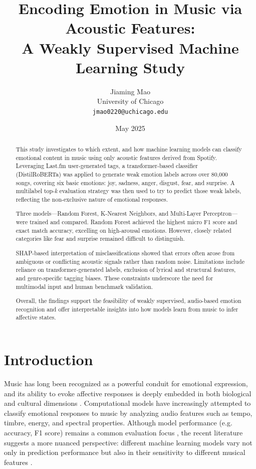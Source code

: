 \documentclass{article}
\title{Encoding Emotion in Music via Acoustic Features:\\
A Weakly Supervised Machine Learning Study}
\author{Jiaming Mao \\ University of Chicago \\ 
\texttt{jmao0220@uchicago.edu}}
\date{May 2025}
\begin{document}
\maketitle

\begin{abstract}
This study investigates to which extent, and how machine learning models can classify emotional content in music using only acoustic features derived from Spotify. Leveraging Last.fm user-generated tags, a transformer-based classifier (DistilRoBERTa) was applied to generate weak emotion labels across over 80,000 songs, covering six basic emotions: joy, sadness, anger, disgust, fear, and surprise. A multilabel top-\textit{k} evaluation strategy was then used to try to predict those weak labels, reflecting the non-exclusive nature of emotional responses.

Three models—Random Forest, K-Nearest Neighbors, and Multi-Layer Perceptron—were trained and compared. Random Forest achieved the highest micro F1 score and exact match accuracy, excelling on high-arousal emotions. However, closely related categories like fear and surprise remained difficult to distinguish. 


SHAP-based interpretation of misclassifications showed that errors often arose from ambiguous or conflicting acoustic signals rather than random noise. Limitations include reliance on transformer-generated labels, exclusion of lyrical and structural features, and genre-specific tagging biases. These constraints underscore the need for multimodal input and human benchmark validation.

Overall, the findings support the feasibility of weakly supervised, audio-based emotion recognition and offer interpretable insights into how models learn from music to infer affective states.
\end{abstract}


\section{Introduction}
    
Music has long been recognized as a powerful conduit for emotional expression, and its ability to evoke affective responses is deeply embedded in both biological and cultural dimensions \parencite{Huron2015, Perlovsky2010}. Computational models have increasingly attempted to classify emotional responses to music by analyzing audio features such as tempo, timbre, energy, and spectral properties. Although model performance (e.g. accuracy, F1 score) remains a common evaluation focus \parencite{Yang2024, Yoo2024}, the recent literature suggests a more nuanced perspective: different machine learning models vary not only in prediction performance but also in their sensitivity to different musical features \parencite{Xia2022, Xu2011}.
\end{document}
